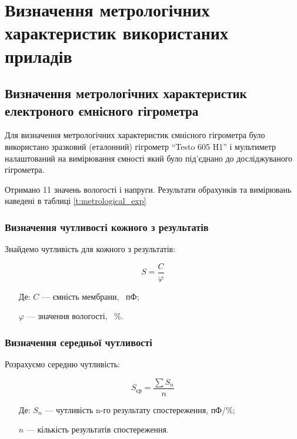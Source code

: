 \chapter{Визначення метрологічних характеристик використаних приладів}
\section{Визначення метрологічних характеристик електроного ємнісного гігрометра}

Для визначення метрологічних характеристик ємнісного гігрометра було використано
зразковий (еталонний) гігрометр ``Testo 605 H1'' і мультиметр налаштований на вимірювання ємності який
було під’єднано до досліджуваного гігрометра.

Отримано 11 значень вологості і напруги. Результати обрахунків та вимірювань наведені в таблиці \ref{t:metrological_exp}



\subsection{Визначення чутливості кожного з результатів}

Знайдемо чутливість для кожного з результатів:

\begin{equation}
  S = \frac{C}{\varphi}
\end{equation}

\begin{itemize}
\item [Де:] $C$ --- ємність мембрани, ~пФ;
\item []$\varphi$ ---  значення вологості, ~\%.
\end{itemize}




\subsection{Визначення середньої чутливості}

 Розрахуємо середню чутливість:

 \begin{equation}
   S_{\text{ср}} = \frac{\sum S_n}{n}
 \end{equation}

 \begin{itemize}
 \item [Де:] $S_n$ --- чутливість n-го результату спостереження, пФ/\%;
 \item []$n$ ---  кількість результатів спостереження.
 \end{itemize}

